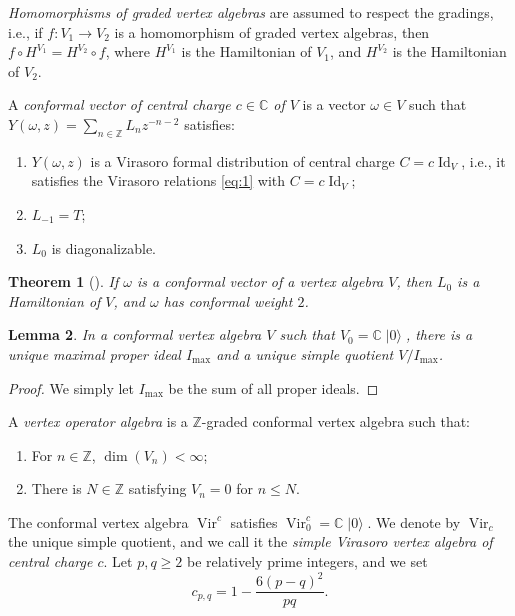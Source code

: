 \documentclass[a4paper, 12pt, reqno]{amsart}
\newtheorem{theorem}{Theorem}[section]
\newtheorem{lemma}[theorem]{Lemma}
\theoremstyle{remark}
\DeclareMathOperator{\Vir}{Vir}
\DeclareMathOperator{\vac}{|0\rangle}
\DeclareMathOperator{\Id}{Id}
\begin{document}
\emph{Homomorphisms of graded vertex algebras} are assumed to respect the gradings, i.e., if $f: V_1 \to V_2$ is a homomorphism of graded vertex algebras, then $f\circ H^{V_1} = H^{V_2}\circ f$, where $H^{V_1}$ is the Hamiltonian of $V_1$, and $H^{V_2}$ is the Hamiltonian of $V_2$.

A \emph{conformal vector of central charge $c \in \mathbb{C}$ of $V$} is a vector $\omega \in V$ such that $Y(\omega, z) = \sum_{n \in \mathbb{Z}}L_nz^{-n - 2}$ satisfies:
\begin{enumerate}
\item $Y(\omega, z)$ is a Virasoro formal distribution of central charge $C = c\Id_V$, i.e., it satisfies the Virasoro relations \eqref{eq:1} with $C = c\Id_V$;
\item $L_{-1} = T$;
\item $L_0$ is diagonalizable.
\end{enumerate}

\begin{theorem}[{\cite[\S3.3]{callegaro_introduction_2017-1}}]
  \label{thr:6}
  If $\omega$ is a conformal vector of a vertex algebra $V$, then $L_0$ is a Hamiltonian of $V$, and $\omega$ has conformal weight $2$.
\end{theorem}

\begin{lemma}
  \label{lmm:3}
  In a conformal vertex algebra $V$ such that $V_0 = \mathbb{C}\vac$, there is a unique maximal proper ideal $I_{\max}$ and a unique simple quotient $V/I_{\max}$.
\end{lemma}

\begin{proof}
  We simply let $I_{\max}$ be the sum of all proper ideals.
\end{proof}

A \emph{vertex operator algebra} is a $\mathbb{Z}$-graded conformal vertex algebra such that:
\begin{enumerate}
\item For $n \in \mathbb{Z}$, $\dim(V_n) < \infty$;
\item There is $N \in \mathbb{Z}$ satisfying $V_n = 0$ for $n \le N$.
\end{enumerate}

The conformal vertex algebra $\Vir^c$ satisfies $\Vir^c_0 = \mathbb{C}\vac$.
We denote by $\Vir_c$ the unique simple quotient, and we call it the \emph{simple Virasoro vertex algebra of central charge $c$}.
Let $p, q \ge 2$ be relatively prime integers, and we set
\begin{equation*}
  c_{p, q} = 1 - \frac{6(p - q)^2}{pq}.
\end{equation*}
\end{document}

